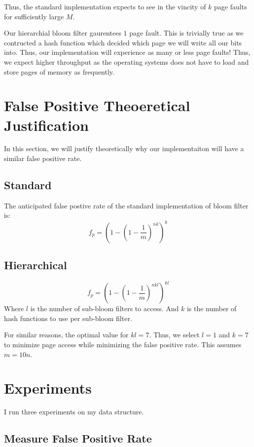 \documentclass[a4paper]{article}
\theoremstyle{plain}
\theoremstyle{definition}
\begin{document}
	
	
	
	
	Thus, the standard implementation expects to see in the vincity of $k$ page faults for sufficiently large $M$. 
	
	Our hierarchial bloom filter gaurentees $1$ page fault. This is trivially true as we contructed a hash function which decided which page we will write all our bits into. Thus, our implementation will experience as many or less page faults!
	Thus, we expect higher throughput as the operating systems does not have to load and store pages of memory as frequently.


	\section{False Positive Theoeretical Justification}
	In this section, we will justify theoretically why our implementaiton will have a similar false positive rate.

	\subsection{Standard}
	The anticipated false postive rate of the standard implementation of bloom filter is:
	\begin{equation}
		f_p = (1-(1-\frac{1}{m})^{nk})^k
	\end{equation}
	\subsection{Hierarchical}
	\begin{equation}
		f_p = (1-(1-\frac{1}{m})^{nkl})^{kl}
	\end{equation}
	Where $l$ is the number of sub-bloom filters to access. And $k$ is the number of hash functions to use per sub-bloom filter.

	For similar reasons, the optimal value for $kl = 7$. Thus, we select $l=1$ and $k=7$ to minimize page access while minimizing the false positive rate.
	This assumes $m = 10n$.
	\section{Experiments}

	I run three experiments on my data structure.

	\subsection{Measure False Positive Rate}
	
\end{document}
